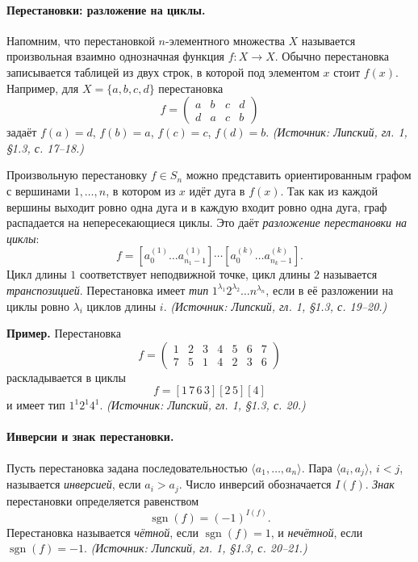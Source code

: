 \documentclass[a4paper,12pt]{article}
\begin{document}
\paragraph{Перестановки: разложение на циклы.}
Напомним, что перестановкой \(n\)-элементного множества \(X\) называется произвольная взаимно однозначная функция \(f:X\to X\). Обычно перестановка записывается таблицей из двух строк, в которой под элементом \(x\) стоит \(f(x)\). Например, для \(X=\{a,b,c,d\}\) перестановка
\[
f=
\begin{pmatrix}
a & b & c & d\\
d & a & c & b
\end{pmatrix}
\]
задаёт \(f(a)=d\), \(f(b)=a\), \(f(c)=c\), \(f(d)=b\).
\textit{(Источник: Липский, гл. 1, §1.3, с. 17--18.)}

Произвольную перестановку \(f\in S_n\) можно представить ориентированным графом с вершинами \(1,\dots,n\), в котором из \(x\) идёт дуга в \(f(x)\). Так как из каждой вершины выходит ровно одна дуга и в каждую входит ровно одна дуга, граф распадается на непересекающиеся циклы. Это даёт \emph{разложение перестановки на циклы}:
\[
f=[a_0^{(1)}\dots a_{n_1-1}^{(1)}]\cdots[a_0^{(k)}\dots a_{n_k-1}^{(k)}].
\]
Цикл длины \(1\) соответствует неподвижной точке, цикл длины \(2\) называется \emph{транспозицией}. Перестановка имеет \emph{тип} \(1^{\lambda_1}2^{\lambda_2}\dots n^{\lambda_n}\), если в её разложении на циклы ровно \(\lambda_i\) циклов длины \(i\).
\textit{(Источник: Липский, гл. 1, §1.3, с. 19--20.)}

\textbf{Пример.} Перестановка
\[
f=
\begin{pmatrix}
1 & 2 & 3 & 4 & 5 & 6 & 7\\
7 & 5 & 1 & 4 & 2 & 3 & 6
\end{pmatrix}
\]
раскладывается в циклы
\[
f=[1\,7\,6\,3][2\,5][4]
\]
и имеет тип \(1^1 2^1 4^1\).
\textit{(Источник: Липский, гл. 1, §1.3, с. 20.)}

\paragraph{Инверсии и знак перестановки.}
Пусть перестановка задана последовательностью \(\langle a_1,\dots,a_n\rangle\). Пара \(\langle a_i,a_j\rangle\), \(i<j\), называется \emph{инверсией}, если \(a_i>a_j\). Число инверсий обозначается \(I(f)\). \emph{Знак} перестановки определяется равенством
\[
\operatorname{sgn}(f)=(-1)^{I(f)}.
\]
Перестановка называется \emph{чётной}, если \(\operatorname{sgn}(f)=1\), и \emph{нечётной}, если \(\operatorname{sgn}(f)=-1\).
\textit{(Источник: Липский, гл. 1, §1.3, с. 20--21.)}
\end{document}
